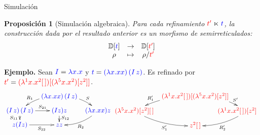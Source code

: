 \documentclass{beamer}
\newtheorem{proes}{Proposición}
\newcommand{\cLam}[1]{{\color{darkBlue} #1}}
\newcommand{\cDist}[1]{{\color{red} #1}}
\begin{document}
\begin{frame}{Simulación}
\begin{proes}[Simulación algebraica]
Para cada refinamiento $\cDist{t'} \refines \cLam{t}$, la construcción dada por el resultado
anterior es un morfismo de semirreticulados:
\[
\begin{array}{ccc}
  \ulbDeriv{\cLam{t}} & \to & \ulbDeriv{\cDist{t'}} \\
  \rho & \mapsto & \rho / \cDist{t'} \\
\end{array}
\]
\end{proes}

\textbf{Ejemplo.}
Sean $\cLam{I} = \cLam{\lam{x}{x}}$ y
$\cLam{t} = \cLam{(\lam{\var}{\var\var})\,(I\, \varthree)}$.
Es refinado por $\cDist{t'} = \cDist{(\lamp{1}{x}{x^2 [\,]}) [(\lamp{5}{x}{x^2}) [z^2]]}$.
{\scriptsize
\[
  \xymatrix@=.2cm{
  &
    \cLam{(\lam{\var}{\var\var})\,(I\, \varthree)}
    \ar@/_.25cm/[dl]_-{\redex_1}
    \ar@/^.25cm/[dr]^-{\redextwo}
  &
  &
  \\
    \cLam{(I\, \varthree)\, (I\, \varthree)}
    \ar[d]_-{\redextwo_{11}}
    \ar[r]^-{\redextwo_{21}}
  &
    \cLam{(I\varthree)\varthree}
    \ar[d]^{\redextwo_{12}}
  &
    \cLam{(\lam{\var}{\var\var})\varthree}
    \ar@/^.25cm/[dl]^-{\redex_2}
  \\
    \cLam{\varthree (I\varthree)}
    \ar[r]_-{\redextwo_{22}}
  &
    \cLam{ \varthree \varthree}
  }\hspace{-0.4cm}\xymatrix@=.2cm{
  &
    \cDist{(\lamp{1}{x}{x^2 [\,]}) [(\lamp{5}{x}{x^2}) [z^2]]}
    \ar@/_.25cm/[dl]_-{\redex'_1}
    \ar@/^.25cm/[dr]^-{\redextwo'}
  \\
    \cDist{(\lamp{5}{x}{x^2}) [z^2] [\,]}
    \ar@/_.25cm/[dr]_-{\redextwo'_1}
  &
  &
    \cDist{\hspace{-1cm}(\lamp{1}{x}{x^2 [\,]}) [z^2]}
    \ar@/^.25cm/[dl]^-{\redex'_2}
  \\
  &
    \cDist{z^2 [\,]}
  }
\]
}
\end{frame}
\end{document}
